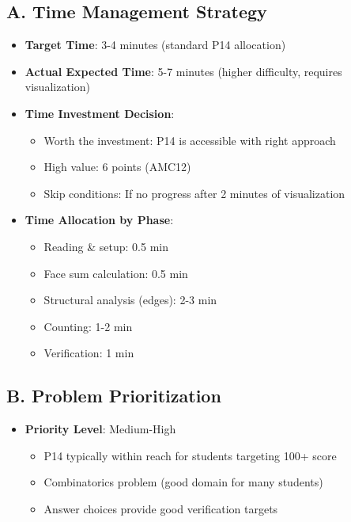 \documentclass[]{article}
\begin{document}
\begin{competitionbox}
\subsection*{A. Time Management Strategy}
\begin{itemize}[leftmargin=*]
    \item \textbf{Target Time}: 3-4 minutes (standard P14 allocation)
    \item \textbf{Actual Expected Time}: 5-7 minutes (higher difficulty, requires visualization)
    \item \textbf{Time Investment Decision}:
    \begin{itemize}
        \item Worth the investment: P14 is accessible with right approach
        \item High value: 6 points (AMC12)
        \item Skip conditions: If no progress after 2 minutes of visualization
    \end{itemize}
    
    \item \textbf{Time Allocation by Phase}:
    \begin{itemize}
        \item Reading \& setup: 0.5 min
        \item Face sum calculation: 0.5 min
        \item Structural analysis (edges): 2-3 min
        \item Counting: 1-2 min
        \item Verification: 1 min
    \end{itemize}
\end{itemize}

\subsection*{B. Problem Prioritization}
\begin{itemize}[leftmargin=*]
    \item \textbf{Priority Level}: Medium-High
    \begin{itemize}
        \item P14 typically within reach for students targeting 100+ score
        \item Combinatorics problem (good domain for many students)
        \item Answer choices provide good verification targets
    \end{itemize}
    

\end{itemize}
\end{competitionbox}
\end{document}
